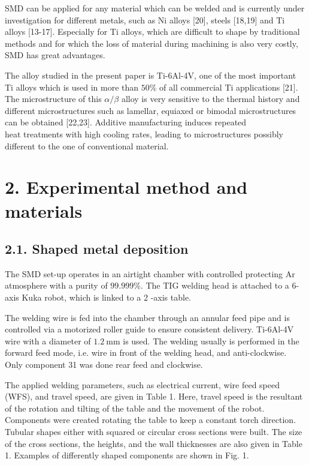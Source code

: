 \documentclass[10pt]{article}
\begin{document}
SMD can be applied for any material which can be welded and is currently under investigation for different metals, such as Ni alloys [20], steels [18,19] and Ti alloys [13-17]. Especially for Ti alloys, which are difficult to shape by traditional methods and for which the loss of material during machining is also very costly, SMD has great advantages.

The alloy studied in the present paper is Ti-6Al-4V, one of the most important Ti alloys which is used in more than $50 \%$ of all commercial Ti applications [21]. The microstructure of this $\alpha / \beta$ alloy is very sensitive to the thermal history and different microstructures such as lamellar, equiaxed or bimodal microstructures can be obtained [22,23]. Additive manufacturing induces repeated\\
heat treatments with high cooling rates, leading to microstructures possibly different to the one of conventional material.

\section*{2. Experimental method and materials}
\subsection*{2.1. Shaped metal deposition}
The SMD set-up operates in an airtight chamber with controlled protecting Ar atmosphere with a purity of $99.999 \%$. The TIG welding head is attached to a 6-axis Kuka robot, which is linked to a 2 -axis table.

The welding wire is fed into the chamber through an annular feed pipe and is controlled via a motorized roller guide to ensure consistent delivery. Ti-6Al-4V wire with a diameter of $1.2 \mathrm{~mm}$ is used. The welding usually is performed in the forward feed mode, i.e. wire in front of the welding head, and anti-clockwise. Only component 31 was done rear feed and clockwise.

The applied welding parameters, such as electrical current, wire feed speed (WFS), and travel speed, are given in Table 1. Here, travel speed is the resultant of the rotation and tilting of the table and the movement of the robot. Components were created rotating the table to keep a constant torch direction. Tubular shapes either with squared or circular cross sections were built. The size of the cross sections, the heights, and the wall thicknesses are also given in Table 1. Examples of differently shaped components are shown in Fig. 1.
\end{document}
